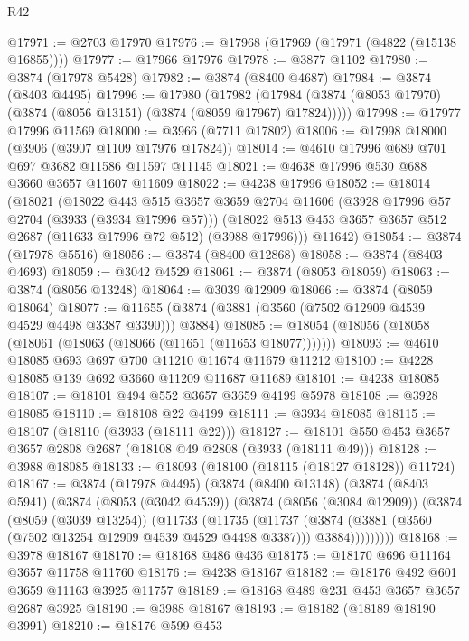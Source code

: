 \begin{lexlean}{R42}
\begin{coremodule}
@17971 := @2703 @17970
@17976 := @17968 (@17969 (@17971 (@4822 (@15138 @16855))))
@17977 := @17966 @17976
@17978 := @3877 @1102
@17980 := @3874 (@17978 @5428)
@17982 := @3874 (@8400 @4687)
@17984 := @3874 (@8403 @4495)
@17996 := @17980
    (@17982 (@17984 (@3874 (@8053 @17970) (@3874 (@8056 @13151) (@3874 (@8059 @17967) @17824)))))
@17998 := @17977 @17996 @11569
@18000 := @3966 (@7711 @17802)
@18006 := @17998 @18000 (@3906 (@3907 @1109 @17976 @17824))
@18014 := @4610 @17996 @689 @701 @697 @3682 @11586 @11597 @11145
@18021 := @4638 @17996 @530 @688 @3660 @3657 @11607 @11609
@18022 := @4238 @17996
@18052 := @18014
    (@18021
      (@18022
        @443
        @515
        @3657
        @3659
        @2704
        @11606
        (@3928 @17996 @57 @2704 (@3933 (@3934 @17996 @57)))
        (@18022 @513 @453 @3657 @3657 @512 @2687 (@11633 @17996 @72 @512) (@3988 @17996)))
      @11642)
@18054 := @3874 (@17978 @5516)
@18056 := @3874 (@8400 @12868)
@18058 := @3874 (@8403 @4693)
@18059 := @3042 @4529
@18061 := @3874 (@8053 @18059)
@18063 := @3874 (@8056 @13248)
@18064 := @3039 @12909
@18066 := @3874 (@8059 @18064)
@18077 := @11655 (@3874 (@3881 (@3560 (@7502 @12909 @4539 @4529 @4498 @3387 @3390))) @3884)
@18085 := @18054 (@18056 (@18058 (@18061 (@18063 (@18066 (@11651 (@11653 @18077)))))))
@18093 := @4610 @18085 @693 @697 @700 @11210 @11674 @11679 @11212
@18100 := @4228 @18085 @139 @692 @3660 @11209 @11687 @11689
@18101 := @4238 @18085
@18107 := @18101 @494 @552 @3657 @3659 @4199 @5978
@18108 := @3928 @18085
@18110 := @18108 @22 @4199
@18111 := @3934 @18085
@18115 := @18107 (@18110 (@3933 (@18111 @22)))
@18127 := @18101 @550 @453 @3657 @3657 @2808 @2687 (@18108 @49 @2808 (@3933 (@18111 @49)))
@18128 := @3988 @18085
@18133 := @18093 (@18100 (@18115 (@18127 @18128)) @11724)
@18167 := @3874
    (@17978 @4495)
    (@3874
      (@8400 @13148)
      (@3874
        (@8403 @5941)
        (@3874
          (@8053 (@3042 @4539))
          (@3874
            (@8056 (@3084 @12909))
            (@3874
              (@8059 (@3039 @13254))
              (@11733
                (@11735
                  (@11737
                    (@3874
                      (@3881 (@3560 (@7502 @13254 @12909 @4539 @4529 @4498 @3387)))
                      @3884)))))))))
@18168 := @3978 @18167
@18170 := @18168 @486 @436
@18175 := @18170 @696 @11164 @3657 @11758 @11760
@18176 := @4238 @18167
@18182 := @18176 @492 @601 @3659 @11163 @3925 @11757
@18189 := @18168 @489 @231 @453 @3657 @3657 @2687 @3925
@18190 := @3988 @18167
@18193 := @18182 (@18189 @18190 @3991)
@18210 := @18176
    @599
    @453

\end{coremodule}
\end{lexlean}
